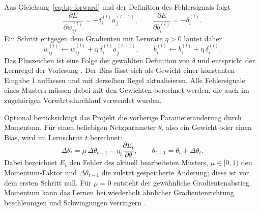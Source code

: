 Aus Gleichung~\eqref{eq:bp-forward} und der Definition des Fehlersignals folgt
\begin{equation}
	\frac{\partial E}{\partial w_{ij}^{(l)}}
	= -\delta_i^{(l)}a_j^{(l-1)},
	\qquad
	\frac{\partial E}{\partial b_i^{(l)}} = -\delta_i^{(l)}.
	\label{eq:bp-gradients}
\end{equation}
Ein Schritt entgegen dem Gradienten mit Lernrate $\eta>0$ lautet daher
\begin{equation}
	w_{ij}^{(l)} \leftarrow w_{ij}^{(l)}
	+ \eta\,\delta_i^{(l)}a_j^{(l-1)},
	\qquad
	b_i^{(l)} \leftarrow b_i^{(l)} + \eta\,\delta_i^{(l)}.
	\label{eq:bp-update}
\end{equation}
Das Pluszeichen ist eine Folge der gewählten Definition von $\delta$ und
entspricht der Lernregel der Vorlesung
\parencite[Folie~10]{vieten_sw03}. Der Bias lässt sich als Gewicht
einer konstanten Eingabe $1$ auffassen und mit derselben Regel aktualisieren.
Alle Fehlersignale eines Musters müssen dabei mit den Gewichten berechnet
werden, die auch im zugehörigen Vorwärtsdurchlauf verwendet wurden.

Optional berücksichtigt das Projekt die vorherige Parameteränderung durch
Momentum. Für einen beliebigen Netzparameter $\theta$, also ein Gewicht oder
einen Bias, wird im Lernschritt $t$ berechnet:
\begin{equation}
	\Delta\theta_t
	= \mu\,\Delta\theta_{t-1}
	-\eta_t\frac{\partial E_t}{\partial\theta},
	\qquad
	\theta_{t+1}=\theta_t+\Delta\theta_t.
	\label{eq:bp-momentum}
\end{equation}
Dabei bezeichnet $E_t$ den Fehler des aktuell bearbeiteten Musters,
$\mu\in[0,1)$ den Momentum-Faktor und $\Delta\theta_{t-1}$ die zuletzt
gespeicherte Änderung; diese ist vor dem ersten Schritt null. Für $\mu=0$
entsteht der gewöhnliche Gradientenabstieg. Momentum kann das Lernen bei
wiederholt ähnlicher Gradientenrichtung beschleunigen und Schwingungen
verringern \parencite[Abschn.~8.3.2]{goodfellow2016}.

\newpage
